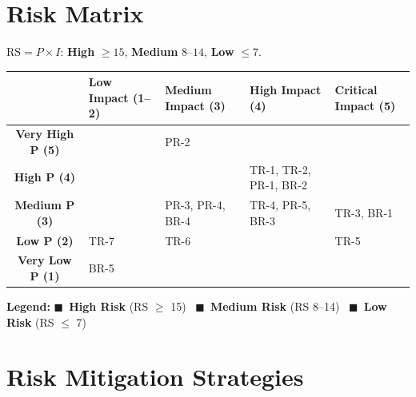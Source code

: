 \documentclass[12pt,a4paper]{article}
\begin{document}
\section{Risk Matrix}

$\text{RS} = P \times I$: \textcolor{highRisk}{\textbf{High}} $\geq 15$, \textcolor{medRisk}{\textbf{Medium}} $8$--$14$, \textcolor{lowRisk}{\textbf{Low}} $\leq 7$.

\bigskip
\begin{center}
\renewcommand{\arraystretch}{1.6}
\begin{tabular}{c | >{\centering\arraybackslash}m{2.8cm} | >{\centering\arraybackslash}m{2.8cm} | >{\centering\arraybackslash}m{2.8cm} | >{\centering\arraybackslash}m{2.8cm}}
 & \textbf{Low Impact (1--2)} & \textbf{Medium Impact (3)} & \textbf{High Impact (4)} & \textbf{Critical Impact (5)} \\
\hline
\textbf{Very High P (5)} & \cellcolor{medRisk!30} & \cellcolor{highRisk!30} PR-2 & \cellcolor{highRisk!30} & \cellcolor{highRisk!30} \\
\hline
\textbf{High P (4)} & \cellcolor{medRisk!30} & \cellcolor{highRisk!30} & \cellcolor{highRisk!30} TR-1, TR-2, PR-1, BR-2 & \cellcolor{highRisk!30} \\
\hline
\textbf{Medium P (3)} & \cellcolor{lowRisk!30} & \cellcolor{medRisk!30} PR-3, PR-4, BR-4 & \cellcolor{medRisk!30} TR-4, PR-5, BR-3 & \cellcolor{highRisk!30} TR-3, BR-1 \\
\hline
\textbf{Low P (2)} & \cellcolor{lowRisk!30} TR-7 & \cellcolor{lowRisk!30} TR-6 & \cellcolor{lowRisk!30} & \cellcolor{medRisk!30} TR-5 \\
\hline
\textbf{Very Low P (1)} & \cellcolor{lowRisk!30} BR-5 & \cellcolor{lowRisk!30} & \cellcolor{lowRisk!30} & \cellcolor{lowRisk!30} \\
\hline
\end{tabular}
\end{center}

\bigskip
\noindent\textbf{Legend:}
\textcolor{highRisk}{$\blacksquare$}~\textbf{High Risk} (RS $\geq$ 15)~\quad
\textcolor{medRisk}{$\blacksquare$}~\textbf{Medium Risk} (RS 8--14)~\quad
\textcolor{lowRisk}{$\blacksquare$}~\textbf{Low Risk} (RS $\leq$ 7)

\section{Risk Mitigation Strategies}
\end{document}
